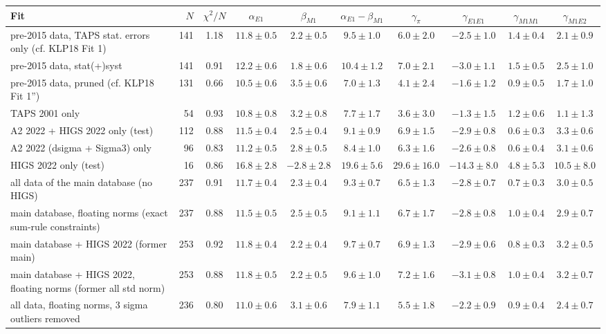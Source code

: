 \begin{tabular}{l r c cccc ccc}
\hline
Fit & $N$ & $\chi^2/N$ & $\alpha_{E1}$ & $\beta_{M1}$ & $\alpha_{E1}-\beta_{M1}$ & $\gamma_\pi$ & $\gamma_{E1E1}$ & $\gamma_{M1M1}$ & $\gamma_{M1E2}$\\\hline
pre-2015 data, TAPS stat. errors only (cf. KLP18 Fit 1) & 141 & 1.18 & $11.8\pm0.5$ & $2.2\pm0.5$ & $9.5\pm1.0$ & $6.0\pm2.0$ & $-2.5\pm1.0$ & $1.4\pm0.4$ & $2.1\pm0.9$\\
pre-2015 data, stat(+)syst & 141 & 0.91 & $12.2\pm0.6$ & $1.8\pm0.6$ & $10.4\pm1.2$ & $7.0\pm2.1$ & $-3.0\pm1.1$ & $1.5\pm0.5$ & $2.5\pm1.0$\\
pre-2015 data, pruned (cf. KLP18 Fit 1'') & 131 & 0.66 & $10.5\pm0.6$ & $3.5\pm0.6$ & $7.0\pm1.3$ & $4.1\pm2.4$ & $-1.6\pm1.2$ & $0.9\pm0.5$ & $1.7\pm1.0$\\
TAPS 2001 only & 54 & 0.93 & $10.8\pm0.8$ & $3.2\pm0.8$ & $7.7\pm1.7$ & $3.6\pm3.0$ & $-1.3\pm1.5$ & $1.2\pm0.6$ & $1.1\pm1.3$\\
A2 2022 + HIGS 2022 only (test) & 112 & 0.88 & $11.5\pm0.4$ & $2.5\pm0.4$ & $9.1\pm0.9$ & $6.9\pm1.5$ & $-2.9\pm0.8$ & $0.6\pm0.3$ & $3.3\pm0.6$\\
A2 2022 (dsigma + Sigma3) only & 96 & 0.83 & $11.2\pm0.5$ & $2.8\pm0.5$ & $8.4\pm1.0$ & $6.3\pm1.6$ & $-2.6\pm0.8$ & $0.6\pm0.4$ & $3.1\pm0.6$\\
HIGS 2022 only (test) & 16 & 0.86 & $16.8\pm2.8$ & $-2.8\pm2.8$ & $19.6\pm5.6$ & $29.6\pm16.0$ & $-14.3\pm8.0$ & $4.8\pm5.3$ & $10.5\pm8.0$\\
all data of the main database (no HIGS) & 237 & 0.91 & $11.7\pm0.4$ & $2.3\pm0.4$ & $9.3\pm0.7$ & $6.5\pm1.3$ & $-2.8\pm0.7$ & $0.7\pm0.3$ & $3.0\pm0.5$\\
main database, floating norms (exact sum-rule constraints) & 237 & 0.88 & $11.5\pm0.5$ & $2.5\pm0.5$ & $9.1\pm1.1$ & $6.7\pm1.7$ & $-2.8\pm0.8$ & $1.0\pm0.4$ & $2.9\pm0.7$\\
main database + HIGS 2022 (former main) & 253 & 0.92 & $11.8\pm0.4$ & $2.2\pm0.4$ & $9.7\pm0.7$ & $6.9\pm1.3$ & $-2.9\pm0.6$ & $0.8\pm0.3$ & $3.2\pm0.5$\\
main database + HIGS 2022, floating norms (former all std norm) & 253 & 0.88 & $11.8\pm0.5$ & $2.2\pm0.5$ & $9.6\pm1.0$ & $7.2\pm1.6$ & $-3.1\pm0.8$ & $1.0\pm0.4$ & $3.2\pm0.7$\\
all data, floating norms, 3 sigma outliers removed & 236 & 0.80 & $11.0\pm0.6$ & $3.1\pm0.6$ & $7.9\pm1.1$ & $5.5\pm1.8$ & $-2.2\pm0.9$ & $0.9\pm0.4$ & $2.4\pm0.7$\\

\end{tabular}
